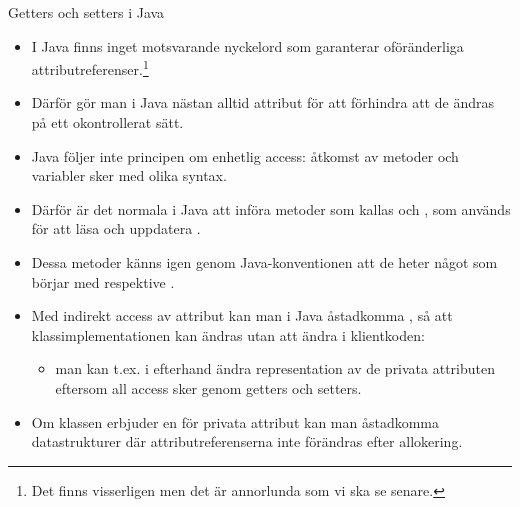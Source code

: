 
\begin{Slide}{Getters och setters i Java}\SlideFontSmall
\begin{itemize}
\item I Java finns inget motsvarande nyckelord  som garanterar oföränderliga attributreferenser.\footnote{Det finns visserligen  men det är annorlunda som vi ska se senare.}

\item Därför gör man i Java nästan alltid attribut  för att förhindra att de ändras på ett okontrollerat sätt.

\item Java följer inte principen om enhetlig access: åtkomst av metoder och variabler sker med olika syntax.

\item Därför är det normala i Java att införa metoder som kallas  och , som används för att  läsa och uppdatera .

\item Dessa metoder känns igen genom Java-konventionen att de heter något som börjar med  respektive .

\item Med indirekt access av attribut kan man i Java åstadkomma , så att klassimplementationen kan ändras utan att ändra i klientkoden:
\begin{itemize}\SlideFontSmall
\item man kan t.ex. i efterhand ändra representation av de privata attributen eftersom all access sker genom getters och setters.
\end{itemize}

\item Om klassen  erbjuder en  för privata attribut kan man åstadkomma  datastrukturer där attributreferenserna inte förändras efter allokering.
\end{itemize}
\end{Slide}



